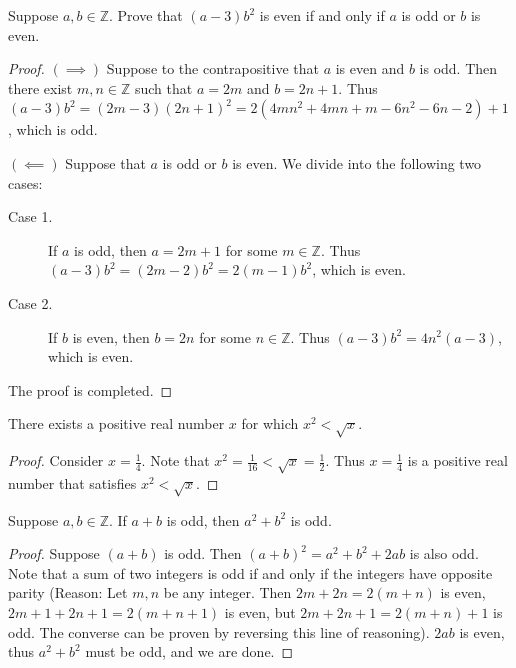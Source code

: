 \documentclass{exam}
\begin{document}
\begin{proposition}{7.11}
    Suppose $a, b\in\mathbb Z$. Prove that $(a-3)b^2$ is even if and only if $a$ is odd or $b$ is even.
\end{proposition}

\begin{proof}
    $(\implies)$ Suppose to the contrapositive that $a$ is even and $b$ is odd. Then there exist $m,n\in\mathbb Z$ such that $a = 2m$ and $b = 2n + 1$. Thus $(a-3)b^2 = (2m - 3)(2n+1)^2 = 2(4mn^2+4mn+m-6n^2-6n-2) + 1$, which is odd.

    $(\impliedby)$ Suppose that $a$ is odd or $b$ is even. We divide into the following two cases:
    \begin{description}
        \item[Case 1. ] If $a$ is odd, then $a = 2m+1$ for some $m\in\mathbb Z$. Thus $(a-3)b^2=(2m-2)b^2=2(m-1)b^2$, which is even.
        \item[Case 2. ] If $b$ is even, then $b=2n$ for some $n\in\mathbb Z$. Thus $(a-3)b^2 = 4n^2(a-3)$, which is even.
    \end{description}
    The proof is completed.
\end{proof}

\begin{proposition}{7.12}
    There exists a positive real number $x$ for which $x^2<\sqrt x$.
\end{proposition}

\begin{proof}
    Consider $x = \frac14$. Note that $x^2 = \frac1{16}<\sqrt x=\frac12$. Thus $x=\frac14$ is a positive real number that satisfies $x^2 < \sqrt x$.
\end{proof}

\begin{proposition}{7.13}
    Suppose $a, b\in\mathbb Z$. If $a + b$ is odd, then $a^2 + b^2$ is odd.
\end{proposition}

\begin{proof}
    Suppose $(a+b)$ is odd. Then $(a+b)^2 = a^2 + b^2 + 2ab$ is also odd. Note that a sum of two integers is odd if and only if the integers have opposite parity (Reason: Let $m, n$ be any integer. Then $2m + 2n = 2(m+n)$ is even, $2m + 1 + 2n + 1 = 2(m+n+1)$ is even, but $2m + 2n + 1 = 2(m+n) + 1$ is odd. The converse can be proven by reversing this line of reasoning). $2ab$ is even, thus $a^2 + b^2$ must be odd, and we are done.
\end{proof}
\end{document}
